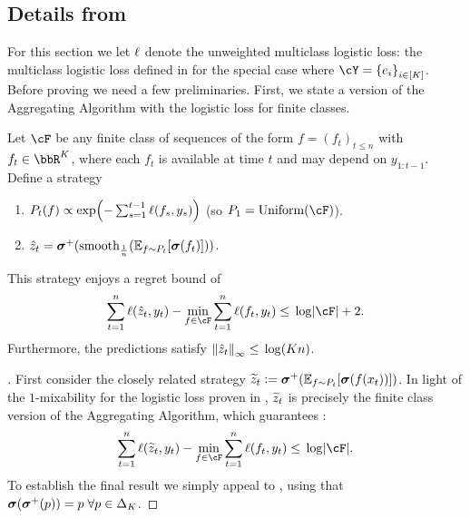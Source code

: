 





\subsection{Details from }
\label{app:general_class}


For this section we let $\ls$ denote the unweighted multiclass logistic loss: the multiclass logistic loss defined in  for the special case where $\cY=\crl*{e_i}_{i\in\brk{K}}$.
Before proving  we need a few preliminaries. First, we state a version of the Aggregating Algorithm with the logistic loss for finite classes.
\begin{lemma}
  \label{lem:aggregating_finite}
  Let $\cF$ be any finite class of sequences of the form $f=(f_{t})_{t\leq{}n}$ with $f_t\in\bbR^{K}$, where each $f_t$ is available at time $t$ and may depend on $y_{1:t-1}$. Define a strategy
  \begin{enumerate}
  \item $P_t(f)\propto\exp\prn*{-\sum_{s=1}^{t-1}\ls(f_s, y_s)}$ (so $P_{1}=\mathrm{Uniform}(\cF)$).
  \item $\hat{z}_t = \mb{\sigma}^{+}(\mathrm{smooth}_{\frac{1}{n}}(\En_{f\sim{}P_t}\brk*{\mb{\sigma}(f_t)}))$.
  \end{enumerate}
  This strategy enjoys a regret bound of
  \begin{equation}
    \label{eq:logistic_finite}
    \sum_{t=1}^{n}\ls(\hat{z}_t, y_t) - \min_{f\in\cF}\sum_{t=1}^{n}\ls(f_t, y_t) \leq{} \log\abs*{\cF} + 2.
  \end{equation}
  Furthermore, the predictions satisfy $\nrm*{\hat{z}_t}_{\infty}\leq{}\log(Kn)$.
\end{lemma}
\begin{proof}[]
  First consider the closely related strategy $\wt{z}_t \ldef \mb{\sigma}^{+}(\En_{f\sim{}P_t}\brk*{\mb{\sigma}(f(x_t))})$. In light of the $1$-mixability for the logistic loss proven in , $\wt{z}_t$ is precisely the finite class version of the Aggregating Algorithm, which guarantees \citep{PLG}:
  \[
    \sum_{t=1}^{n}\ls(\wt{z}_t, y_t) - \min_{f\in\cF}\sum_{t=1}^{n}\ls(f_t, y_t) \leq{} \log\abs*{\cF}.
  \]
  To establish the final result we simply appeal to , using that $\mb{\sigma}(\mb{\sigma}^{+}(p)) = p\;\forall{}p\in\Delta_{K}$.
  \end{proof}


